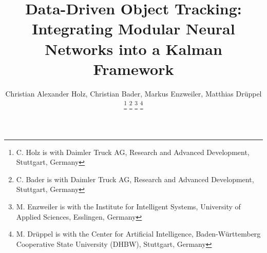 \documentclass[letterpaper, 10 pt, journal, twoside]{IEEEtran}
\begin{document}
\title{Data-Driven Object Tracking: Integrating Modular Neural Networks into a Kalman Framework}

\author{Christian Alexander Holz, Christian Bader, Markus Enzweiler, Matthias Drüppel
	\thanks{C. Holz is with Daimler Truck AG, Research and Advanced Development, Stuttgart, Germany}
	\thanks{C. Bader is with Daimler Truck AG, Research and Advanced Development, Stuttgart, Germany}
	\thanks{M. Enzweiler is with the Institute for Intelligent Systems, University of Applied Sciences, Esslingen, Germany}
	\thanks{M. Drüppel is with the Center for Artificial Intelligence,
    Baden-Württemberg Cooperative State University (DHBW), Stuttgart, Germany}
}


\maketitle
\end{document}
